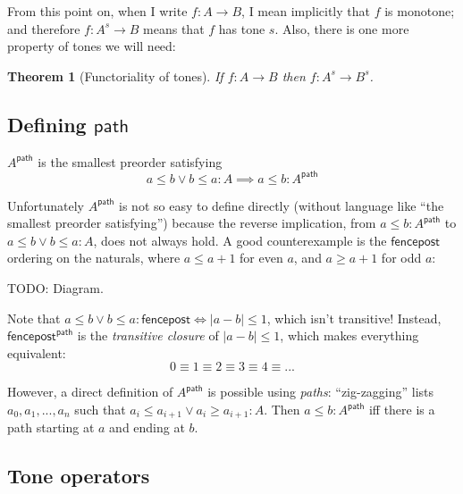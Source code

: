 \documentclass[a4paper]{tufte-handout}
\newtheorem{theorem}{Theorem}
\newcommand{\todo}[1]{{\color{red}#1}}
\newcommand{\ms}[1]{\ensuremath{\mathsf{#1}}}
\renewcommand{\path}{\ms{path}}
\begin{document}
From this point on, when I write $f : A \to B$, I mean implicitly that $f$ is
monotone; and therefore $f : A^s \to B$ means that $f$ has tone $s$.
%
Also, there is one more property of tones we will need:

\begin{theorem}[Functoriality of tones]\label{thm:tone-functoriality}
  If $f : A \to B$ then $f : A^s \to B^s$.
\end{theorem}


\subsection{Defining \ms{path}} \label{sec:defining-path}

$A^\path$ is the smallest preorder satisfying
\[ a \le b \vee b \le a : A \implies a \le b : A^\path \]

Unfortunately $A^\path$ is not so easy to define directly (without
language like ``the smallest preorder satisfying'')
%
because the reverse implication, from $a \le b : A^\path$ to $a \le b \vee b \le
a : A$, does not always hold. A good counterexample is the \ms{fencepost}
ordering on the naturals, where $a \le a+1$ for even $a$, and $a \ge a+1$ for
odd $a$:

\todo{TODO: Diagram}.

Note that $a \le b \vee b \le a : \ms{fencepost} \iff |a-b| \le 1$, which isn't
transitive! Instead, $\ms{fencepost}^\path$ is the \emph{transitive closure} of
$|a-b| \le 1$, which makes everything equivalent:
\[ 0 \equiv 1 \equiv 2 \equiv 3 \equiv 4 \equiv ... \]

However, a direct definition of $A^\path$ is possible using \emph{paths}:
``zig-zagging'' lists $a_0, a_1, ..., a_n$ such that $a_i \le a_{i+1} \vee a_i
\ge a_{i+1} : A$. Then $a \le b : A^\path$ iff there is a path starting at $a$
and ending at $b$.


\subsection{Tone operators}
\end{document}
